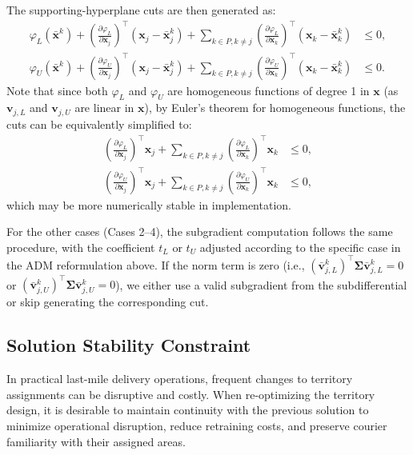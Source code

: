 \documentclass[preprint,12pt,authoryear]{elsarticle}
\begin{document}
The supporting-hyperplane cuts are then generated as:
\begin{align}
\varphi_L(\bar{\mathbf{x}}^k) + \left(\frac{\partial \varphi_L}{\partial \mathbf{x}_j}\right)^\top (\mathbf{x}_j - \bar{\mathbf{x}}_j^k) + \sum_{k \in P, k \neq j} \left(\frac{\partial \varphi_L}{\partial \mathbf{x}_k}\right)^\top (\mathbf{x}_k - \bar{\mathbf{x}}_k^k) &\leqslant 0, \label{eq:rel_workload_d2_supporting_cut_lower} \\
\varphi_U(\bar{\mathbf{x}}^k) + \left(\frac{\partial \varphi_U}{\partial \mathbf{x}_j}\right)^\top (\mathbf{x}_j - \bar{\mathbf{x}}_j^k) + \sum_{k \in P, k \neq j} \left(\frac{\partial \varphi_U}{\partial \mathbf{x}_k}\right)^\top (\mathbf{x}_k - \bar{\mathbf{x}}_k^k) &\leqslant 0. \label{eq:rel_workload_d2_supporting_cut_upper}
\end{align}
Note that since both $\varphi_L$ and $\varphi_U$ are homogeneous functions of degree 1 in $\mathbf{x}$ (as $\mathbf{v}_{j,L}$ and $\mathbf{v}_{j,U}$ are linear in $\mathbf{x}$), by Euler's theorem for homogeneous functions, the cuts can be equivalently simplified to:
\begin{align}
\left(\frac{\partial \varphi_L}{\partial \mathbf{x}_j}\right)^\top \mathbf{x}_j + \sum_{k \in P, k \neq j} \left(\frac{\partial \varphi_L}{\partial \mathbf{x}_k}\right)^\top \mathbf{x}_k &\leqslant 0, \\
\left(\frac{\partial \varphi_U}{\partial \mathbf{x}_j}\right)^\top \mathbf{x}_j + \sum_{k \in P, k \neq j} \left(\frac{\partial \varphi_U}{\partial \mathbf{x}_k}\right)^\top \mathbf{x}_k &\leqslant 0,
\end{align}
which may be more numerically stable in implementation.

For the other cases (Cases 2--4), the subgradient computation follows the same procedure, with the coefficient $t_L$ or $t_U$ adjusted according to the specific case in the ADM reformulation above. If the norm term is zero (i.e., $(\bar{\mathbf{v}}_{j,L}^k)^{\top} \boldsymbol{\Sigma} \bar{\mathbf{v}}_{j,L}^k = 0$ or $(\bar{\mathbf{v}}_{j,U}^k)^{\top} \boldsymbol{\Sigma} \bar{\mathbf{v}}_{j,U}^k = 0$), we either use a valid subgradient from the subdifferential or skip generating the corresponding cut.


\subsection{Solution Stability Constraint}

In practical last-mile delivery operations, frequent changes to territory assignments can be disruptive and costly. When re-optimizing the territory design, it is desirable to maintain continuity with the previous solution to minimize operational disruption, reduce retraining costs, and preserve courier familiarity with their assigned areas.
\end{document}
